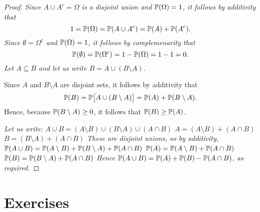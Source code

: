 \break

\begin{proof}
\ben
\it %
Since $A\cup A^c=\Omega$ is a disjoint union and $\mathbb{P}(\Omega)=1$, it follows by additivity that 
\[
1 = \mathbb{P}(\Omega) = \mathbb{P}(A\cup A^c) = \mathbb{P}(A) + \mathbb{P}(A^c).
\]
\it %
Since $\emptyset=\Omega^c$ and $\mathbb{P}(\Omega)=1$, it follows by complemenarity that
\[
\mathbb{P}(\emptyset) = \mathbb{P}(\Omega^c) = 1 - \mathbb{P}(\Omega) = 1 - 1 = 0.
\]
\it %
Let $A\subseteq B$ and let us write $B = A\cup (B\setminus A)$. 

Since $A$ and $B\setminus A$ are disjoint sets, it follows by additivity that
\[
\mathbb{P}(B) = \mathbb{P}\big[A\cup (B\setminus A)\big] = \mathbb{P}(A) + \mathbb{P}(B\setminus A).
\]
Hence, because $\mathbb{P}(B\setminus A)\geq 0$, it follows that $\mathbb{P}(B) \geq \mathbb{P}(A)$.

\break

\it %
Let us write:
\bit
\it $A\cup B = (A\setminus B) \cup (B\setminus A) \cup (A\cap B)$
\it $A 		 = (A\setminus B) + (A\cap B)$
\it $B 		 = (B\setminus A) + (A\cap B)$
\eit
These are disjoint unions, so by additivity, 
\bit
\it $\mathbb{P}(A\cup B) = \mathbb{P}(A\setminus B) + \mathbb{P}(B\setminus A) + \mathbb{P}(A\cap B)$
\it $\mathbb{P}(A) 		= \mathbb{P}(A\setminus B) + \mathbb{P}(A\cap B)$
\it $\mathbb{P}(B)		= \mathbb{P}(B\setminus A) + \mathbb{P}(A\cap B)$
\eit
Hence $\mathbb{P}(A\cup B) = \mathbb{P}(A) + \mathbb{P}(B) - \mathbb{P}(A\cap B)$, as required.
\een
\end{proof}


\section{Exercises}


\endinput
